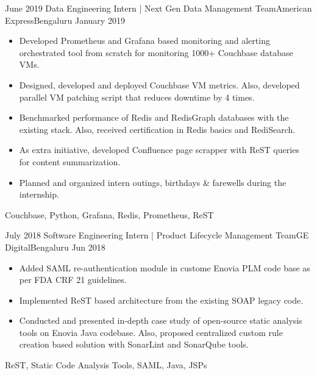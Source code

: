 \begin{experiences}
  \experience
    {June 2019} {Data Engineering Intern | Next Gen Data Management Team}{American Express}{Bengaluru}
    {January 2019}    {
                      \begin{itemize}
                        \item Developed Prometheus and Grafana based monitoring and alerting orchestrated tool from scratch for monitoring 1000+ Couchbase database VMs.
                        \item Designed, developed and deployed Couchbase VM metrics. Also, developed parallel VM patching script that reduces downtime by 4 times.
                        \item Benchmarked performance of Redis and RedisGraph databases with the existing stack. Also, received certification in Redis basics and RediSearch.
                        \item As extra initiative, developed Confluence page scrapper with ReST queries for content summarization. 
                        \item Planned and organized intern outings, birthdays \& farewells during the internship.
                      \end{itemize}
                    }
                    {Couchbase, Python, Grafana, Redis, Prometheus, ReST}
  \emptySeparator
  
  \experience
    {July 2018} {Software Engineering Intern | Product Lifecycle Management Team}{GE Digital}{Bengaluru}
    {Jun 2018}    {
                      \begin{itemize}
                        \item Added SAML re-authentication module in custome Enovia PLM code base as per FDA CRF 21 guidelines.
                        \item Implemented ReST based architecture from the existing SOAP legacy code.
                        \item Conducted and presented in-depth case study of open-source static analysis tools on Enovia Java codebase. Also, proposed centralized custom rule creation based solution with SonarLint and SonarQube tools.
                      \end{itemize}
                    }
                    {ReST, Static Code Analysis Tools, SAML, Java, JSPs}
  \emptySeparator
  
\end{experiences}

